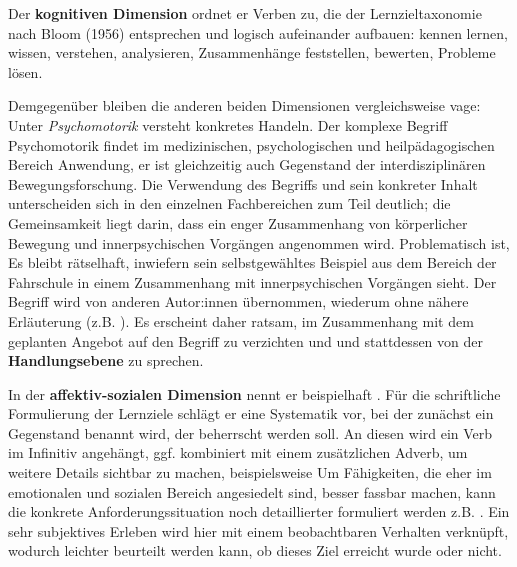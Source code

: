 \documentclass[
  twoside,
  parskip=half-,
  paper=176mm:246mm,
  BCOR=14mm,
  DIV=14,
]{scrreprt}
\begin{document}
Der \textbf{kognitiven Dimension} ordnet er Verben zu, die der Lernzieltaxonomie nach Bloom (1956) entsprechen  \autocites[vgl.][1008]{reich-claassen}[vgl. auch][22f.]{kos} und logisch aufeinander aufbauen: kennen lernen, wissen, verstehen, analysieren, Zusammenhänge feststellen, bewerten, Probleme lösen. 

Demgegenüber bleiben die anderen beiden Dimensionen vergleichsweise vage: Unter \textit{Psychomotorik} versteht \citeauthor{schlutz} konkretes Handeln. Der komplexe Begriff Psychomotorik findet im medizinischen, psychologischen und heilpädagogischen Bereich Anwendung, er ist gleichzeitig auch Gegenstand der interdisziplinären Bewegungsforschung. Die Verwendung des Begriffs und sein konkreter Inhalt unterscheiden sich in den einzelnen Fachbereichen zum Teil deutlich; die Gemeinsamkeit liegt darin, dass ein enger Zusammenhang von körperlicher Bewegung und innerpsychischen Vorgängen angenommen wird. Problematisch ist,  Es bleibt rätselhaft, inwiefern \citeauthor{schlutz} sein selbstgewähltes Beispiel aus dem Bereich der Fahrschule  in einem Zusammenhang mit innerpsychischen Vorgängen sieht. 
 Der Begriff wird von anderen Autor:innen übernommen, wiederum ohne nähere Erläuterung (z.B. \citeauthor{reich-claassen}). Es erscheint daher ratsam, im Zusammenhang mit dem geplanten Angebot auf den Begriff zu verzichten und und stattdessen von der \textbf{Handlungsebene} zu sprechen.
 
 In der \textbf{affektiv-sozialen Dimension} nennt er beispielhaft . Für die schriftliche Formulierung der Lernziele schlägt er eine Systematik vor, bei der zunächst ein Gegenstand benannt wird, der beherrscht werden soll. An diesen wird ein Verb im Infinitiv angehängt, ggf. kombiniert mit einem zusätzlichen Adverb, um weitere Details sichtbar zu machen, beispielsweise  Um Fähigkeiten, die eher im emotionalen und sozialen Bereich angesiedelt sind, besser fassbar machen, kann die konkrete Anforderungssituation noch detaillierter formuliert werden z.B. . Ein sehr subjektives Erleben wird hier mit einem beobachtbaren Verhalten verknüpft, wodurch leichter beurteilt werden kann, ob dieses Ziel erreicht wurde oder nicht.
\end{document}
